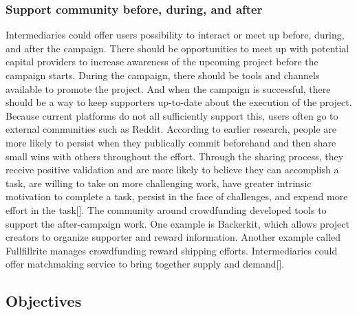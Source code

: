 \subsubsection*{Support community before, during, and after}
Intermediaries could offer users possibility to interact or meet up before, during, and after the campaign.
There should be opportunities to meet up with potential capital providers to increase awareness of the upcoming project before the campaign starts. During the campaign, there should be tools and channels available to promote the project. And when the campaign is successful, there should be a way to keep supporters
up-to-date about the execution of the project. Because current platforms do not all sufficiently support this,
users often go to external communities such as Reddit.
According to earlier research, people are more likely to persist when they publically commit beforehand
and then share small wins with others throughout the effort. Through the sharing process, they receive positive validation and are more likely to believe they can accomplish a task, are willing to take on more challenging work, have greater intrinsic motivation to complete a task, persist in the face of challenges, and expend
more effort in the task[\cite{crowdMotiv}].
The community around crowdfunding developed tools to support the after-campaign work. One example
is Backerkit, which allows project creators to organize supporter and reward information. Another example
called Fullfillrite manages crowdfunding reward shipping efforts. Intermediaries could offer matchmaking
service to bring together supply and demand[\cite{doi:10.5465/ambpp.2014.209}].

\subsection{Objectives}

